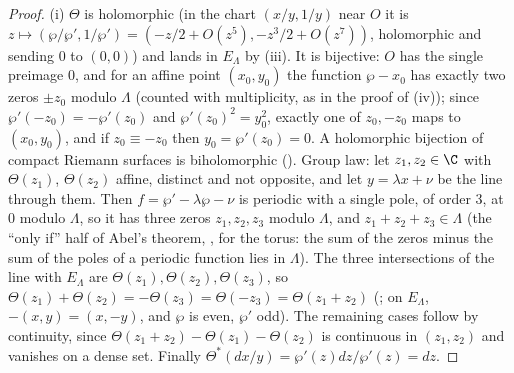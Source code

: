 \begin{proof}
(i) $\Theta$ is holomorphic (in the chart $(x/y,1/y)$ near $O$ it is $z\mapsto(\wp/\wp',1/\wp')=(-z/2+O(z^5),-z^3/2+O(z^7))$, holomorphic and sending $0$ to $(0,0)$) and lands in $E_\Lambda$ by (iii). It is bijective: $O$ has the single
preimage $0$, and for an affine point $(x_0,y_0)$ the function $\wp-x_0$ has exactly two zeros $\pm z_0$ modulo $\Lambda$ (counted with multiplicity, as in the proof of
(iv)); since $\wp'(-z_0)=-\wp'(z_0)$ and $\wp'(z_0)^2=y_0^2$, exactly one of $z_0,-z_0$ maps to $(x_0,y_0)$, and if $z_0\equiv-z_0$ then $y_0=\wp'(z_0)=0$. A holomorphic
bijection of compact Riemann surfaces is biholomorphic (). Group law: let $z_1,z_2\in\C$ with $\Theta(z_1)$, $\Theta(z_2)$ affine, distinct and not opposite, and let $y=\lambda x+\nu$
be the line through them. Then $f=\wp'-\lambda\wp-\nu$ is periodic with a single pole, of order $3$, at $0$ modulo $\Lambda$, so it has three zeros $z_1,z_2,z_3$ modulo $\Lambda$, and
$z_1+z_2+z_3\in\Lambda$ (the ``only if'' half of Abel's theorem, , for the torus: the sum of the zeros minus the sum of the poles of a periodic function lies in $\Lambda$). The
three intersections of the line with $E_\Lambda$ are $\Theta(z_1),\Theta(z_2),\Theta(z_3)$, so $\Theta(z_1)+\Theta(z_2)=-\Theta(z_3)=\Theta(-z_3)=\Theta(z_1+z_2)$ (; on $E_\Lambda$,
$-(x,y)=(x,-y)$, and $\wp$ is even, $\wp'$ odd). The remaining cases follow by continuity, since $\Theta(z_1+z_2)-\Theta(z_1)-\Theta(z_2)$ is continuous in $(z_1,z_2)$ and vanishes on a dense set.
Finally $\Theta^*(dx/y)=\wp'(z)dz/\wp'(z)=dz$.


\end{proof}
